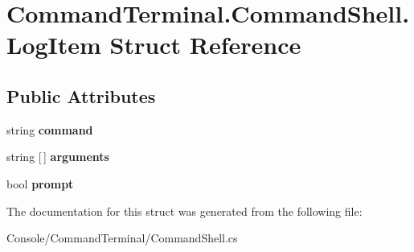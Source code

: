 \hypertarget{struct_command_terminal_1_1_command_shell_1_1_log_item}{}\section{Command\+Terminal.\+Command\+Shell.\+Log\+Item Struct Reference}
\label{struct_command_terminal_1_1_command_shell_1_1_log_item}
\subsection*{Public Attributes}
\begin{DoxyCompactItemize}
\item 
\mbox{\label{struct_command_terminal_1_1_command_shell_1_1_log_item_ad87e78aed0ca8248fd944ccd535d896d}} 
string {\bfseries command}
\item 
\mbox{\label{struct_command_terminal_1_1_command_shell_1_1_log_item_af11721ae615b69556c220bd0680dbcf3}} 
string \mbox{[}$\,$\mbox{]} {\bfseries arguments}
\item 
\mbox{\label{struct_command_terminal_1_1_command_shell_1_1_log_item_aede5b372340380c74846793c76c44e19}} 
bool {\bfseries prompt}
\end{DoxyCompactItemize}


The documentation for this struct was generated from the following file\+:\begin{DoxyCompactItemize}
\item 
Console/\+Command\+Terminal/Command\+Shell.\+cs\end{DoxyCompactItemize}
